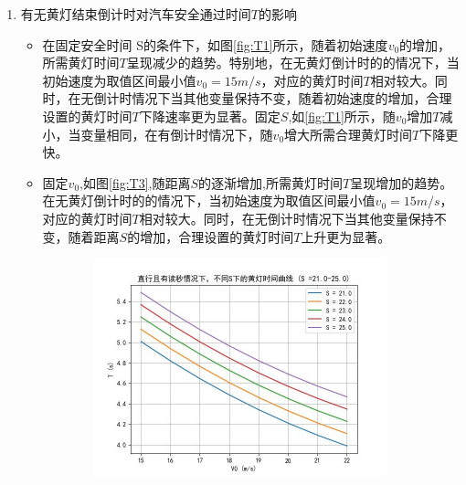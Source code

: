 \documentclass[withoutpreface,bwprint]{cumcmthesis}
\begin{document}
\begin{enumerate}
	\normalsize
	\item 有无黄灯结束倒计时对汽车安全通过时间$T$的影响
	\begin{itemize}
		\item 在固定安全时间
		S的条件下，如图\ref{fig:T1}所示，随着初始速度$v_0$的增加，所需黄灯时间$T$呈现减少的趋势。特别地，在无黄灯倒计时的的情况下，当初始速度为取值区间最小值$v_0=15m/s$，对应的黄灯时间$T$相对较大。同时，在无倒计时情况下当其他变量保持不变，随着初始速度的增加，合理设置的黄灯时间$T$下降速率更为显著。固定$S$,如\ref{fig:T1}所示，随$v_0$增加$T$减小，当变量相同，在有倒计时情况下，随$v_0$增大所需合理黄灯时间$T$下降更快。
		\item 固定$v_0$,如图\ref{fig:T3},随距离$S$的逐渐增加,所需黄灯时间$T$呈现增加的趋势。在无黄灯倒计时的的情况下，当初始速度为取值区间最小值$v_0=15m/s$，对应的黄灯时间$T$相对较大。同时，在无倒计时情况下当其他变量保持不变，随着距离$S$的增加，合理设置的黄灯时间$T$上升更为显著。
	\end{itemize}
	\begin{figure}[htbp!]
		\centering
		\begin{subfigure}[t]{0.45\textwidth}
			\includegraphics[width=\textwidth]{pics/Time_Curve_S_WCT_STR25.00}
			\label{fig:S25_WCT}
		\end{subfigure}
		\hfill
		\begin{subfigure}[t]{0.45\textwidth}

\end{subfigure}
\end{figure}
\end{enumerate}
\end{document}

